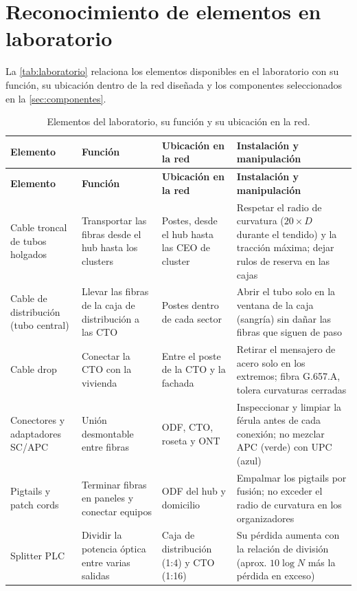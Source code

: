 \section{Reconocimiento de elementos en laboratorio}
\label{sec:laboratorio}
La \autoref{tab:laboratorio} relaciona los elementos disponibles en el laboratorio con su función, su ubicación dentro de la red diseñada y los componentes seleccionados en la \autoref{sec:componentes}.

\begin{longtable}{|p{2.4cm}|p{3.5cm}|p{3.2cm}|p{4.6cm}|}
    \caption{Elementos del laboratorio, su función y su ubicación en la red.}\label{tab:laboratorio}\\
    \hline
    \textbf{Elemento} & \textbf{Función} & \textbf{Ubicación en la red} & \textbf{Instalación y manipulación} \\
    \hline
    \endfirsthead
    \hline
    \textbf{Elemento} & \textbf{Función} & \textbf{Ubicación en la red} & \textbf{Instalación y manipulación} \\
    \hline
    \endhead
    Cable troncal de tubos holgados & Transportar las fibras desde el hub hasta los clusters & Postes, desde el hub hasta las CEO de cluster & Respetar el radio de curvatura ($20 \times D$ durante el tendido) y la tracción máxima; dejar rulos de reserva en las cajas \\
    \hline
    Cable de distribución (tubo central) & Llevar las fibras de la caja de distribución a las CTO & Postes dentro de cada sector & Abrir el tubo solo en la ventana de la caja (sangría) sin dañar las fibras que siguen de paso \\
    \hline
    Cable drop & Conectar la CTO con la vivienda & Entre el poste de la CTO y la fachada & Retirar el mensajero de acero solo en los extremos; fibra G.657.A, tolera curvaturas cerradas \\
    \hline
    Conectores y adaptadores SC/APC & Unión desmontable entre fibras & ODF, CTO, roseta y ONT & Inspeccionar y limpiar la férula antes de cada conexión; no mezclar APC (verde) con UPC (azul) \\
    \hline
    Pigtails y patch cords & Terminar fibras en paneles y conectar equipos & ODF del hub y domicilio & Empalmar los pigtails por fusión; no exceder el radio de curvatura en los organizadores \\
    \hline
    Splitter PLC & Dividir la potencia óptica entre varias salidas & Caja de distribución (1:4) y CTO (1:16) & Su pérdida aumenta con la relación de división (aprox. $10 \log N$ más la pérdida en exceso) \\

\end{longtable}
